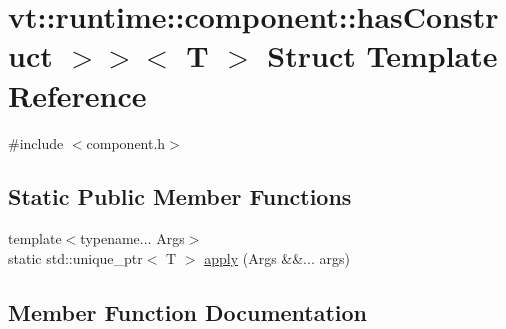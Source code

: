 \hypertarget{structvt_1_1runtime_1_1component_1_1_component_constructor_3_01_t_00_01typename_01std_1_1enable_ba8f7403cb2e97bf6260fe78f92dad1c}{}\section{vt\+:\+:runtime\+:\+:component\+:\+:has\+Construct $>$$>$$<$ T $>$ Struct Template Reference}
\label{structvt_1_1runtime_1_1component_1_1_component_constructor_3_01_t_00_01typename_01std_1_1enable_ba8f7403cb2e97bf6260fe78f92dad1c}


{\ttfamily \#include $<$component.\+h$>$}

\subsection*{Static Public Member Functions}
\begin{DoxyCompactItemize}
\item 
{\footnotesize template$<$typename... Args$>$ }\\static std\+::unique\+\_\+ptr$<$ T $>$ \hyperlink{structvt_1_1runtime_1_1component_1_1_component_constructor_3_01_t_00_01typename_01std_1_1enable_ba8f7403cb2e97bf6260fe78f92dad1c_a1f55462e5211eb8df297e407db494169}{apply} (Args \&\&... args)
\end{DoxyCompactItemize}


\subsection{Member Function Documentation}
\mbox{\label{structvt_1_1runtime_1_1component_1_1_component_constructor_3_01_t_00_01typename_01std_1_1enable_ba8f7403cb2e97bf6260fe78f92dad1c_a1f55462e5211eb8df297e407db494169}} 
